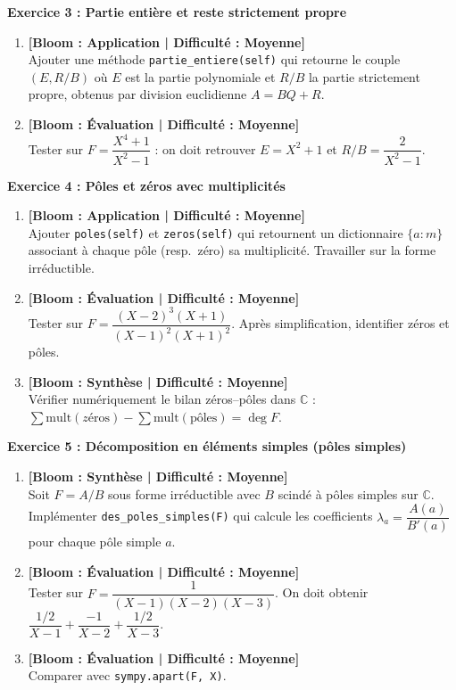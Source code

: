\vspace{0.3cm}

\noindent\textbf{Exercice 3 : Partie entière et reste strictement propre}
\begin{enumerate}
    \item \textbf{[Bloom : Application | Difficulté : Moyenne]} \\
    Ajouter une méthode \texttt{partie\_entiere(self)} qui retourne le couple $(E, R/B)$ où $E$ est la partie polynomiale et $R/B$ la partie strictement propre, obtenus par division euclidienne $A = BQ + R$.
    \item \textbf{[Bloom : Évaluation | Difficulté : Moyenne]} \\
    Tester sur $F = \dfrac{X^4 + 1}{X^2 - 1}$ : on doit retrouver $E = X^2 + 1$ et $R/B = \dfrac{2}{X^2 - 1}$.
\end{enumerate}

\vspace{0.3cm}

\noindent\textbf{Exercice 4 : Pôles et zéros avec multiplicités}
\begin{enumerate}
    \item \textbf{[Bloom : Application | Difficulté : Moyenne]} \\
    Ajouter \texttt{poles(self)} et \texttt{zeros(self)} qui retournent un dictionnaire $\{a : m\}$ associant à chaque pôle (resp.\ zéro) sa multiplicité. Travailler sur la forme irréductible.
    \item \textbf{[Bloom : Évaluation | Difficulté : Moyenne]} \\
    Tester sur $F = \dfrac{(X - 2)^3 (X + 1)}{(X - 1)^2 (X + 1)^2}$. Après simplification, identifier zéros et pôles.
    \item \textbf{[Bloom : Synthèse | Difficulté : Moyenne]} \\
    Vérifier numériquement le bilan zéros--pôles dans $\mathbb{C}$ :
    $\sum \mathrm{mult}(z\text{éros}) - \sum \mathrm{mult}(\text{pôles}) = \deg F$.
\end{enumerate}

\vspace{0.3cm}

\noindent\textbf{Exercice 5 : Décomposition en éléments simples (pôles simples)}
\begin{enumerate}
    \item \textbf{[Bloom : Synthèse | Difficulté : Moyenne]} \\
    Soit $F = A/B$ sous forme irréductible avec $B$ scindé à pôles simples sur $\mathbb{C}$. Implémenter \texttt{des\_poles\_simples(F)} qui calcule les coefficients $\lambda_a = \dfrac{A(a)}{B'(a)}$ pour chaque pôle simple $a$.
    \item \textbf{[Bloom : Évaluation | Difficulté : Moyenne]} \\
    Tester sur $F = \dfrac{1}{(X - 1)(X - 2)(X - 3)}$. On doit obtenir $\dfrac{1/2}{X-1} + \dfrac{-1}{X-2} + \dfrac{1/2}{X-3}$.
    \item \textbf{[Bloom : Évaluation | Difficulté : Moyenne]} \\
    Comparer avec \texttt{sympy.apart(F, X)}.
\end{enumerate}


